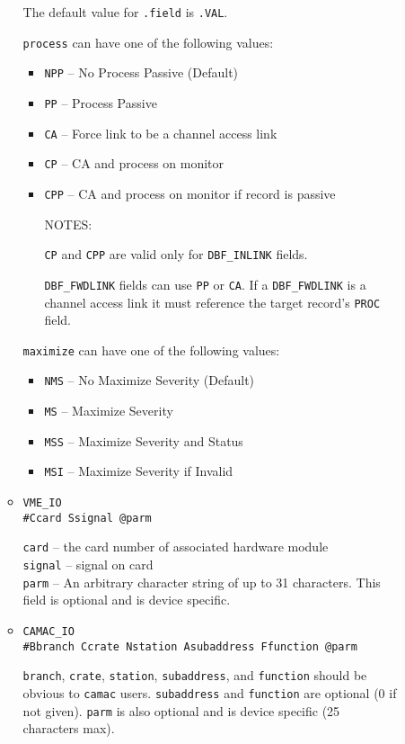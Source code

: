 \begin{description}
\begin{itemize}
\begin{itemize}
The default value for \verb|.field| is \verb|.VAL|.

\verb|process| can have one of the following values:

\begin{itemize}
\item \verb|NPP| -- No Process Passive (Default)
\item \verb|PP| -- Process Passive
\item \verb|CA| -- Force link to be a channel access link
\item \verb|CP| -- CA and process on monitor
\item \verb|CPP| -- CA and process on monitor if record is passive

NOTES:

\verb|CP| and \verb|CPP| are valid only for \verb|DBF_INLINK| fields.

\verb|DBF_FWDLINK| fields can use \verb|PP| or \verb|CA|.
If a \verb|DBF_FWDLINK| is a channel access link it must reference the target record's \verb|PROC| field.
\end{itemize}

\verb|maximize| can have one of the following values:

\begin{itemize}
\item \verb|NMS| -- No Maximize Severity (Default)
\item \verb|MS| -- Maximize Severity
\item \verb|MSS| -- Maximize Severity and Status
\item \verb|MSI| -- Maximize Severity if Invalid
\end{itemize}

\item \verb|VME_IO| \\
\verb|#Ccard Ssignal @parm|

\verb|card| -- the card number of associated hardware module \\
\verb|signal| -- signal on card \\
\verb|parm| -- An arbitrary character string of up to 31 characters. This field is optional and is device specific.

\item \verb|CAMAC_IO| \\
\verb|#Bbranch Ccrate Nstation Asubaddress Ffunction @parm|

\verb|branch|, \verb|crate|, \verb|station|, \verb|subaddress|, and \verb|function| should be obvious to \verb|camac| users.
\verb|subaddress| and \verb|function| are optional (0 if not given).
\verb|parm| is also optional and is device specific (25 characters max).


\end{itemize}
\end{itemize}
\end{description}
